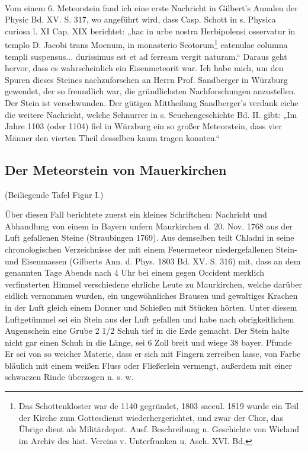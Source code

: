 \documentclass[a4paper, 11pt, oneside]{article}
\begin{document}
\paragraph{}
Vom einem 6. Meteorstein fand ich eine erste Nachricht in Gilbert's Annalen der Physic Bd. XV. S. 317, wo angeführt wird, dass Casp. Schott in s. Physica curiosa l. XI Cap. XIX berichtet: „hac in urbe nostra Herbipolensi osservatur in templo D. Jacobi trans Moenum, in monasterio Scotorum\footnote{Das Schottenkloster war de 1140 gegründet, 1803 saecul. 1819 wurde ein Teil der Kirche zum Gottesdienst wiederhergerichtet, und zwar der Chor, das Übrige dient als Militärdepot. Ausf. Beschreibung u. Geschichte von Wieland im Archiv des hist. Vereins v. Unterfranken u. Asch. XVI. Bd.} catenulae columna templi suspensus... durissimus est et ad ferream vergit naturam.“ Daraus geht hervor, dass es wahrscheinlich ein Eisenmeteorit war. Ich habe mich, um den Spuren dieses Steines nachzuforschen an Herrn Prof. Sandberger in Würzburg gewendet, der so freundlich war, die gründlichsten Nachforschungen anzustellen. Der Stein ist verschwunden. Der gütigen Mittheilung Sandberger's verdank eiche die weitere Nachricht, welche Schnurrer in s. Seuchengeschichte Bd. II. gibt: „Im Jahre 1103 (oder 1104) fiel in Würzburg ein so großer Meteorstein, dass vier Männer den vierten Theil desselben kaum tragen konnten.“
\clearpage
\subsection{Der Meteorstein von Mauerkirchen}
(Beiliegende Tafel Figur I.)

Über diesen Fall berichtete zuerst ein kleines Schriftchen: Nachricht und Abhandlung von einem in Bayern unfern Maurkirchen d. 20. Nov. 1768 aus der Luft gefallenen Steine (Straubingen 1769). Aus demselben teilt Chladni in seine chronologischen Verzeichnisse der mit einem Feuermeteor niedergefallenen Stein- und Eisenmassen (Gilberts Ann. d. Phys. 1803 Bd. XV. S. 316) mit, dass an dem genannten Tage Abends nach 4 Uhr bei einem gegen Occident merklich verfinsterten Himmel verschiedene ehrliche Leute zu Maurkirchen, welche darüber eidlich vernommen wurden, ein ungewöhnliches Brausen und gewaltiges Krachen in der Luft gleich einem Donner und Schießen mit Stücken hörten. Unter diesem Luftgetümmel sei ein Stein aus der Luft gefallen und habe nach obrigkeitlichem Augenschein eine Grube 2 1/2 Schuh tief in die Erde gemacht. Der Stein halte nicht gar einen Schuh in die Länge, sei 6 Zoll breit und wiege 38 bayer. Pfunde Er sei von so weicher Materie, dass er sich mit Fingern zerreiben lasse, von Farbe bläulich mit einem weißen Fluss oder Fließerlein vermengt, außerdem mit einer schwarzen Rinde überzogen n. s. w.
\end{document}
